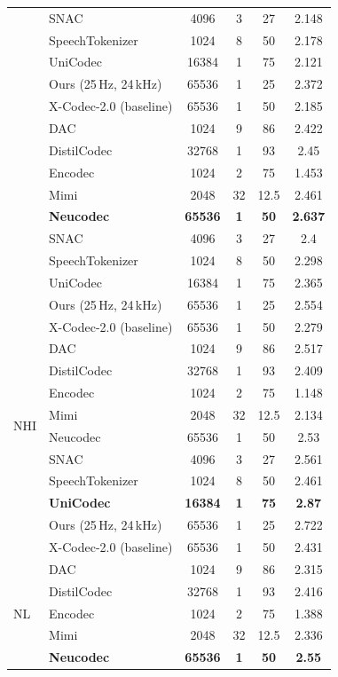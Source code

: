 \documentclass[preprint]{article}
\begin{document}
\begin{longtable}{llcccc}
  & SNAC & 4096 & 3 & 27 & 2.148 \\
  & SpeechTokenizer & 1024 & 8 & 50 & 2.178 \\
  & UniCodec & 16384 & 1 & 75 & 2.121 \\
  & Ours (25\,Hz, 24\,kHz) & 65536 & 1 & 25 & 2.372 \\
  & X-Codec-2.0 (baseline) & 65536 & 1 & 50 & 2.185 \\
\newpage
\multirow{8}{*}{NE-NP}
  & DAC & 1024 & 9 & 86 & 2.422 \\
  & DistilCodec & 32768 & 1 & 93 & 2.45 \\
  & Encodec & 1024 & 2 & 75 & 1.453 \\
  & Mimi & 2048 & 32 & 12.5 & 2.461 \\
  & \textbf{Neucodec} & \textbf{65536} & \textbf{1} & \textbf{50} & \textbf{2.637} \\
  & SNAC & 4096 & 3 & 27 & 2.4 \\
  & SpeechTokenizer & 1024 & 8 & 50 & 2.298 \\
  & UniCodec & 16384 & 1 & 75 & 2.365 \\
  & Ours (25\,Hz, 24\,kHz) & 65536 & 1 & 25 & 2.554 \\
  & X-Codec-2.0 (baseline) & 65536 & 1 & 50 & 2.279 \\
\midrule
\multirow{8}{*}{NHI}
  & DAC & 1024 & 9 & 86 & 2.517 \\
  & DistilCodec & 32768 & 1 & 93 & 2.409 \\
  & Encodec & 1024 & 2 & 75 & 1.148 \\
  & Mimi & 2048 & 32 & 12.5 & 2.134 \\
  & Neucodec & 65536 & 1 & 50 & 2.53 \\
  & SNAC & 4096 & 3 & 27 & 2.561 \\
  & SpeechTokenizer & 1024 & 8 & 50 & 2.461 \\
  & \textbf{UniCodec} & \textbf{16384} & \textbf{1} & \textbf{75} & \textbf{2.87} \\
  & Ours (25\,Hz, 24\,kHz) & 65536 & 1 & 25 & 2.722 \\
  & X-Codec-2.0 (baseline) & 65536 & 1 & 50 & 2.431 \\
\midrule
\multirow{8}{*}{NL}
  & DAC & 1024 & 9 & 86 & 2.315 \\
  & DistilCodec & 32768 & 1 & 93 & 2.416 \\
  & Encodec & 1024 & 2 & 75 & 1.388 \\
  & Mimi & 2048 & 32 & 12.5 & 2.336 \\
  & \textbf{Neucodec} & \textbf{65536} & \textbf{1} & \textbf{50} & \textbf{2.55} \\

\end{longtable}
\end{document}
